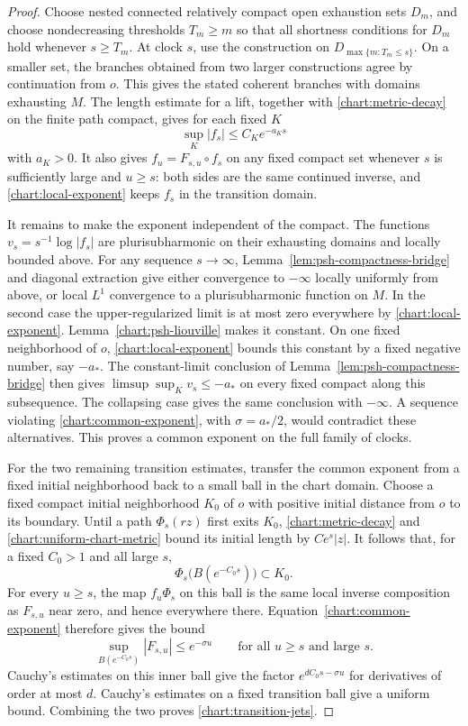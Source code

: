 \begin{proof}
Choose nested connected relatively compact open exhaustion
sets $D_m$, and choose nondecreasing thresholds $T_m\ge m$
so that all shortness conditions for $D_m$ hold whenever
$s\ge T_m$.  At clock $s$, use the construction on
$D_{\max\{m:T_m\le s\}}$.  On a smaller set, the branches
obtained from two larger constructions agree by continuation
from $o$.  This gives the stated coherent branches with
domains exhausting $M$.  The length estimate for a lift,
together with \eqref{chart:metric-decay} on the finite path
compact, gives for each fixed $K$
\begin{equation}\label{chart:local-exponent}
 \sup_K|f_s|\le C_Ke^{-a_Ks}
\end{equation}
with $a_K>0$.  It also gives
$f_u=F_{s,u}\circ f_s$ on any fixed compact set whenever
$s$ is sufficiently large and $u\ge s$: both sides are
the same continued inverse, and
\eqref{chart:local-exponent} keeps $f_s$ in the transition
domain.

It remains to make the exponent independent of the compact.
The functions $v_s=s^{-1}\log|f_s|$ are plurisubharmonic on
their exhausting domains and locally bounded above.
For any sequence $s\to\infty$,
Lemma~\ref{lem:psh-compactness-bridge} and diagonal extraction
give either convergence to
$-\infty$ locally uniformly from above, or local $L^1$
convergence to a plurisubharmonic function on $M$.
In the second case the upper-regularized limit is at most
zero everywhere by \eqref{chart:local-exponent}.
Lemma~\ref{chart:psh-liouville} makes it constant.  On one
fixed neighborhood of $o$, \eqref{chart:local-exponent}
bounds this constant by a fixed negative number, say
$-a_*$.  The constant-limit conclusion of
Lemma~\ref{lem:psh-compactness-bridge} then gives
$\limsup\sup_Kv_s\le-a_*$ on every fixed compact along
this subsequence.  The collapsing case gives the same
conclusion with $-\infty$.  A sequence violating
\eqref{chart:common-exponent}, with $\sigma=a_*/2$, would
contradict these alternatives.  This proves a common
exponent on the full family of clocks.

For the two remaining transition estimates, transfer the common
exponent from a fixed initial neighborhood back to a small ball in
the chart domain.  Choose a fixed compact initial neighborhood $K_0$
of $o$ with positive initial distance from $o$ to its
boundary.  Until a path $\Phi_s(rz)$ first exits $K_0$,
\eqref{chart:metric-decay} and
\eqref{chart:uniform-chart-metric} bound its initial length
by $Ce^s|z|$.  It follows that, for a fixed $C_0>1$ and
all large $s$,
\[
 \Phi_s\bigl(B(e^{-C_0s})\bigr)\subset K_0.
\]
For every $u\ge s$, the map $f_u\Phi_s$ on this ball is
the same local inverse composition as $F_{s,u}$ near zero,
and hence everywhere there.  Equation~\eqref{chart:common-exponent}
therefore gives the bound
\begin{equation}\label{chart:transition-inner-bound}
 \sup_{B(e^{-C_0s})}|F_{s,u}|\le e^{-\sigma u}
 \qquad\text{for all }u\ge s\text{ and large }s.
\end{equation}
Cauchy's estimates on this inner ball give the factor
$e^{dC_0s-\sigma u}$ for derivatives of order at most $d$.
Cauchy's estimates on a fixed transition ball give a uniform
bound.  Combining the two proves
\eqref{chart:transition-jets}.


\end{proof}
